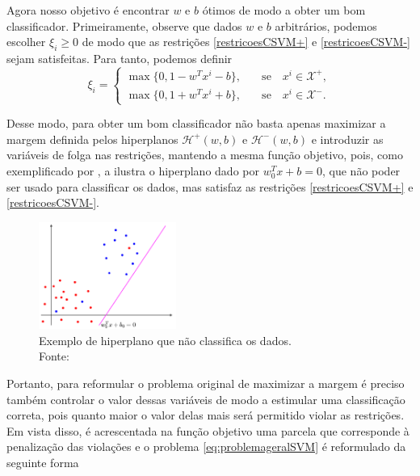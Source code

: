 \documentclass[12pt,a4paper]{scrartcl}
\def\Xset{\mathcal{X}}
\def\Hset{\mathcal{H}}
\theoremstyle{definition}%
\begin{document}
Agora nosso objetivo é encontrar $w$ e $b$ ótimos de modo a obter um bom classificador. Primeiramente, observe que dados $w$ e $b$ arbitrários, podemos escolher $\xi_{i} \geq 0$ de modo que as restrições \eqref{restricoesCSVM+} e \eqref{restricoesCSVM-} sejam satisfeitas. Para tanto, podemos definir
\[
\xi_{i} =  \left \{ \begin{array}{cc} \max\{0, 1-w^{T}x^{i}-b\}, & \quad \text{se} \quad x^{i} \in \Xset^{+}, \\
\max\{0, 1+w^{T}x^{i}+b\}, & \quad \text{se} \quad x^{i} \in \Xset^{-}.
\end{array} \right .
\]
 
Desse modo, para obter um bom classificador não basta apenas maximizar a margem definida pelos hiperplanos $\Hset^{+} (w,b)$ e $\Hset^{-} (w,b)$ e introduzir as variáveis de folga nas restrições, mantendo a mesma função objetivo, pois, como exemplificado por \textcite{Evelin2017}, a  ilustra o hiperplano dado por $w_{0}^{T}x+b = 0$, que não poder ser usado para classificar os dados, mas satisfaz as restrições \eqref{restricoesCSVM+} e \eqref{restricoesCSVM-}. 

\begin{figure}[!h] 
	\centering
	\includegraphics[width=0.40\textwidth]{restricoes_maximizacaomargem}
	\caption{Exemplo de hiperplano que não classifica os dados. \label{fig:hiperplano_nao_classificador} \\ Fonte: \textcite{Evelin2017}}
\end{figure}
 

Portanto, para reformular o problema original de maximizar a margem é preciso também controlar o valor dessas variáveis de modo a estimular uma classificação correta, pois quanto maior o valor delas mais será permitido violar as restrições. Em vista disso, é acrescentada na função objetivo uma parcela que corresponde à penalização das violações e o problema \eqref{eq:problemageralSVM} é reformulado da seguinte forma
\end{document}
